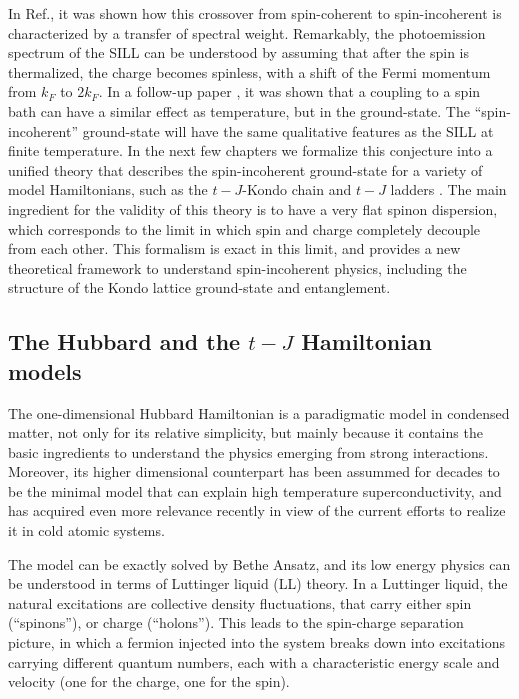 \documentclass[article,11pt]{revtex4}
\begin{document}
In Ref., it was shown how this crossover from spin-coherent to spin-incoherent is characterized by a transfer of spectral weight. Remarkably, the photoemission spectrum of the SILL can be understood by assuming that after the spin is thermalized, the charge becomes spinless, with a shift of the Fermi momentum from $k_F$ to $2k_F$. In a follow-up paper \cite{Feiguin2011}, it was shown that a coupling to a spin bath can have a similar effect as temperature, but in the ground-state. The ``spin-incoherent'' ground-state will have the same qualitative features as the SILL at finite temperature. In the next few chapters we formalize this conjecture into a unified theory that describes the spin-incoherent ground-state for a variety of model Hamiltonians, such as the $t-J$-Kondo chain and $t-J$ ladders \cite{Soltanieh-ha2012}. The main ingredient for the validity of this theory is to have a very flat spinon dispersion, which corresponds to the limit in which spin and charge completely decouple from each other. This formalism is exact in this limit, and provides a new theoretical framework to understand spin-incoherent physics, including the structure of the Kondo lattice ground-state and entanglement.

\subsection {The Hubbard and the $t-J$ Hamiltonian models}

The one-dimensional Hubbard Hamiltonian is a paradigmatic model in condensed matter, not only for its relative simplicity, but mainly because it contains the basic ingredients to understand the physics emerging from strong interactions. Moreover, its higher dimensional counterpart has been assummed for decades to be the minimal model that can explain high temperature superconductivity, and has acquired even more relevance recently in view of the current efforts to realize it in cold atomic systems. 

The model can be exactly solved by Bethe Ansatz, and its low energy physics can be understood in terms of Luttinger liquid (LL) theory\cite{Haldane1981,Gogolin,GiamarchiBook}. 
In a Luttinger liquid, the natural
excitations are collective density fluctuations, that carry either spin
(``spinons''), or charge (``holons''). This leads to the spin-charge separation picture, in
which a fermion injected into the system breaks down into excitations carrying different quantum numbers, each with a characteristic energy scale and velocity (one for the charge, one for the spin).
\end{document}
